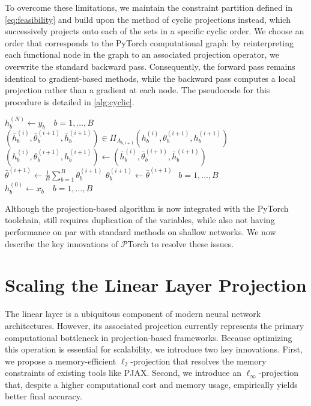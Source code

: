 To overcome these limitations, we maintain the  constraint partition defined in \eqref{eq:feasibility} and build upon the method of cyclic projections instead, which successively projects onto each of the sets in a specific cyclic order. We choose an order that corresponds to the PyTorch computational graph: by reinterpreting each functional node in the graph to an associated projection operator, we overwrite the standard backward pass. Consequently, the forward pass remains identical to gradient-based methods, while the backward pass computes a local projection rather than a gradient at each node. The pseudocode for this procedure is detailed in \cref{alg:cyclic}.
\begin{algorithm}
\caption{Cyclic projections method on the PyTorch computational graph.}\label{alg:cyclic}
\begin{algorithmic}[1]
\State $h^{(N)}_b \gets y_b \quad b=1,\ldots, B$  
        \State $(\bar h^{(i)}_b, \bar \theta^{(i+1)}_b, \bar h^{(i+1)}_b) \in \Pi_{A_{b,i+1}}(h^{(i)}_b, \theta^{(i+1)}_b, h^{(i+1)}_b)$  
        \State $(h^{(i)}_b, \theta^{(i+1)}_b, h^{(i+1)}_b) \gets (\bar h^{(i)}_b, \bar \theta^{(i+1)}_b, \bar h^{(i+1)}_b)$ 
    \EndFor
    \State $\bar \theta^{(i+1)} \gets \frac{1}{B}\sum_{b=1}^B \theta_{b}^{(i+1)}$
    \State $\theta^{(i+1)}_b \gets \bar \theta^{(i+1) \quad} b=1,\ldots, B$   
\EndFor
\State $h^{(0)}_b \gets x_b \quad b=1,\ldots,B$ 
\end{algorithmic}
\end{algorithm}
\newpage
Although the projection-based algorithm is now integrated with the PyTorch toolchain,  still requires duplication of the variables, while also not having performance on par with standard methods on shallow networks. We now describe the key innovations of $\mathcal{P}$Torch to resolve these issues.


\section{Scaling the Linear Layer Projection}
The linear layer is a ubiquitous component of modern neural network architectures. However, its associated projection currently represents the primary computational bottleneck in projection-based frameworks. Because optimizing this operation is essential for scalability, we introduce two key innovations. First, we propose a memory-efficient $\ell_2$-projection that resolves the memory constraints of existing tools like PJAX. Second, we introduce an $\ell_\infty$-projection that, despite a higher computational cost and memory usage, empirically yields better final accuracy.
\label{sec:matmul}
